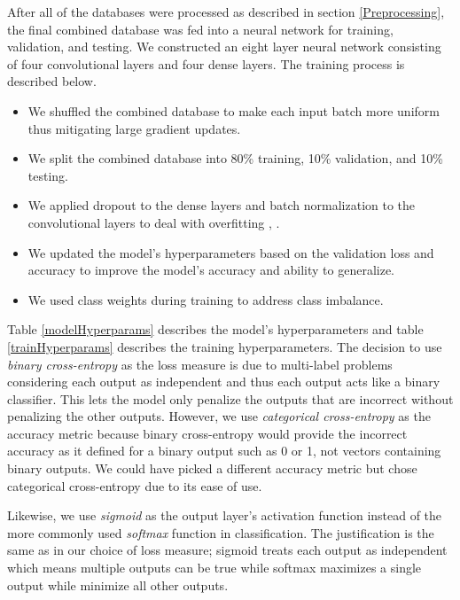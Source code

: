\documentclass[a4paper, 10pt, conference]{ieeeconf}      %
\begin{document}
After all of the databases were processed as described in section \ref{Preprocessing}, the final combined database was fed into a neural network for training, validation, and testing. We constructed an eight layer neural network consisting of four convolutional layers and four dense layers. The training process is described below.
\begin{itemize}
	\item We shuffled the combined database to make each input batch more uniform thus mitigating large gradient updates.
	\item We split the combined database into 80\% training, 10\% validation, and 10\% testing.
	\item We applied dropout to the dense layers and batch normalization to the convolutional layers to deal with overfitting \cite{Srivastava2014}, \cite{Ioffe2015}.
	\item We updated the model's hyperparameters based on the validation loss and accuracy to improve the model's accuracy and ability to generalize.
	\item We used class weights during training to address class imbalance.
\end{itemize}

Table \ref{modelHyperparams} describes the model's hyperparameters and table \ref{trainHyperparams} describes the training hyperparameters. The decision to use \textit{binary cross-entropy} as the loss measure is due to multi-label problems considering each output as independent and thus each output acts like a binary classifier. This lets the model only penalize the outputs that are incorrect without penalizing the other outputs. However, we use \textit{categorical cross-entropy} as the accuracy metric because binary cross-entropy would provide the incorrect accuracy as it defined for a binary output such as 0 or 1, not vectors containing binary outputs. We could have picked a different accuracy metric but chose categorical cross-entropy due to its ease of use.

Likewise, we use \textit{sigmoid} as the output layer's activation function instead of the more commonly used \textit{softmax} function in classification. The justification is the same as in our choice of loss measure; sigmoid treats each output as independent which means multiple outputs can be true while softmax maximizes a single output while minimize all other outputs.
\end{document}
